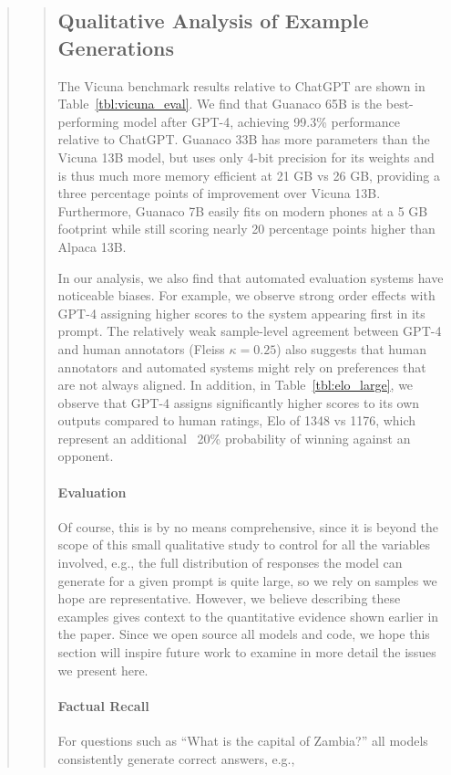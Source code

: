 \begin{quote}
\begin{quote}
\subsection{Qualitative Analysis of Example Generations}
\label{ssec:examples}

The Vicuna benchmark \cite{vicuna2023} results relative to ChatGPT are shown in Table~\ref{tbl:vicuna_eval}. We find that {Guanaco} 65B is the best-performing model after GPT-4, achieving 99.3\% performance relative to ChatGPT. {Guanaco} 33B has more parameters than the Vicuna 13B model, but uses only 4-bit precision for its weights and is thus much more memory efficient at 21 GB vs 26 GB, providing a three percentage points of improvement over Vicuna 13B. Furthermore, {Guanaco} 7B easily fits on modern phones at a 5 GB footprint while still scoring nearly 20 percentage points higher than Alpaca 13B. 

In our analysis, we also find that automated evaluation systems have noticeable biases. For example, we observe strong order effects with GPT-4 assigning higher scores to the system appearing first in its prompt. The relatively weak sample-level agreement between GPT-4 and human annotators (Fleiss $\kappa=0.25$) also suggests that human annotators and automated systems might rely on preferences that are not always aligned. In addition, in Table~\ref{tbl:elo_large}, we observe that GPT-4 assigns significantly higher scores to its own outputs compared to human ratings, Elo of 1348 vs 1176, which represent an additional ~20\% probability of winning against an opponent. 

\paragraph{Evaluation}

Of course, this is by no means comprehensive, since it is beyond the scope of this small qualitative study to control for all the variables involved, e.g., the full distribution of responses the model can generate for a given prompt is quite large, so we rely on samples we hope are representative. However, we believe describing these examples gives context to the quantitative evidence shown earlier in the paper. Since we open source all models and code, we hope this section will inspire future work to examine in more detail the issues we present here.
\paragraph{Factual Recall} For questions such as ``What is the capital of Zambia?'' all models consistently generate correct answers, e.g.,


\end{quote}
\end{quote}
